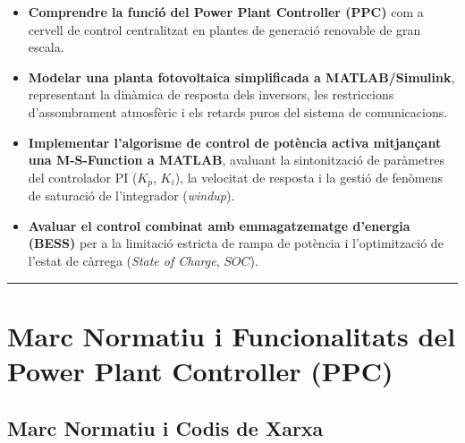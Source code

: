 \documentclass[
  catalan,
  letterpaper,
  DIV=11,
  numbers=noendperiod]{scrartcl}
\providecommand{\tightlist}{%
  \setlength{\itemsep}{0pt}\setlength{\parskip}{0pt}}
\begin{document}
\begin{tcolorbox}[enhanced jigsaw, arc=.35mm, bottomrule=.15mm, bottomtitle=1mm, breakable, colback=white, colbacktitle=quarto-callout-note-color!10!white, colframe=quarto-callout-note-color-frame, coltitle=black, left=2mm, leftrule=.75mm, opacityback=0, opacitybacktitle=0.6, rightrule=.15mm, title=\textcolor{quarto-callout-note-color}{\faInfo}\hspace{0.5em}{Objectius Principals de la Pràctica}, titlerule=0mm, toprule=.15mm, toptitle=1mm]

\begin{itemize}
\tightlist
\item
  \textbf{Comprendre la funció del Power Plant Controller (PPC)} com a
  cervell de control centralitzat en plantes de generació renovable de
  gran escala.
\item
  \textbf{Modelar una planta fotovoltaica simplificada a
  MATLAB/Simulink}, representant la dinàmica de resposta dels inversors,
  les restriccions d'assombrament atmosfèric i els retards puros del
  sistema de comunicacions.
\item
  \textbf{Implementar l'algorisme de control de potència activa
  mitjançant una M-S-Function a MATLAB}, avaluant la sintonització de
  paràmetres del controlador PI (\(K_p\), \(K_i\)), la velocitat de
  resposta i la gestió de fenòmens de saturació de l'integrador
  (\emph{windup}).
\item
  \textbf{Avaluar el control combinat amb emmagatzematge d'energia
  (BESS)} per a la limitació estricta de rampa de potència i
  l'optimització de l'estat de càrrega (\emph{State of Charge},
  \(SOC\)).
\end{itemize}

\end{tcolorbox}

\begin{center}\rule{0.5\linewidth}{0.5pt}\end{center}

\section{Marc Normatiu i Funcionalitats del Power Plant Controller
(PPC)}\label{marc-normatiu-i-funcionalitats-del-power-plant-controller-ppc}

\subsection{Marc Normatiu i Codis de
Xarxa}\label{marc-normatiu-i-codis-de-xarxa}
\end{document}
